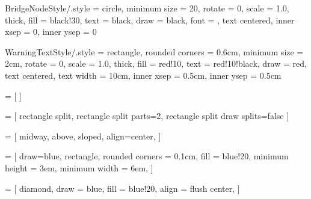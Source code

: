 \tikzset
{
  BridgeNodeStyle/.style =
  {
    circle,                                 %
    minimum size    = 20,                   %
    rotate          = 0,                    %
    scale           = 1.0,                  %
    thick,                                  %
    fill            = black!30,             %
    text            = black,                %
    draw            = black,                %
    font            = \small,               %
    text centered,                          %
    inner xsep      = 0,                    %
    inner ysep      = 0                     %
  }
}






\tikzset
{
  WarningTextStyle/.style =
  {
    rectangle,                      %
    rounded corners = 0.6cm,        %
    minimum size    = 2cm,          %
    rotate          = 0,            %
    scale           = 1.0,          %
    thick,                          %
    fill            = red!10,       %
    text            = red!10!black, %
    draw            = red,          %
    text centered,                  %
    text width      = 10cm,         %
    inner xsep      = 0.5cm,        %
    inner ysep      = 0.5cm         %
  }
}


 =
[
]

 =
[
rectangle split,
rectangle split parts=2,
rectangle split draw splits=false
]

=
[
midway,
above,
sloped,
align=center,
]

 =
[
draw=blue,
rectangle,
rounded corners = 0.1cm,
fill            = blue!20,
minimum height  = 3em,
minimum width   = 6em,
]

 =
[
diamond,
draw        = blue,
fill        = blue!20,
align       = flush center,
]

